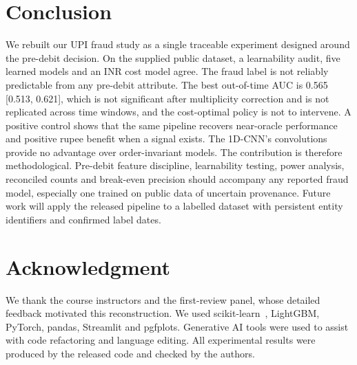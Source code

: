 \documentclass[conference]{IEEEtran}
\begin{document}
\section{Conclusion}
We rebuilt our UPI fraud study as a single traceable experiment designed around the pre-debit decision. On the supplied public dataset, a learnability audit, five learned models and an INR cost model agree. The fraud label is not reliably predictable from any pre-debit attribute. The best out-of-time AUC is 0.565 [0.513, 0.621], which is not significant after multiplicity correction and is not replicated across time windows, and the cost-optimal policy is not to intervene. A positive control shows that the same pipeline recovers near-oracle performance and positive rupee benefit when a signal exists. The 1D-CNN's convolutions provide no advantage over order-invariant models. The contribution is therefore methodological. Pre-debit feature discipline, learnability testing, power analysis, reconciled counts and break-even precision should accompany any reported fraud model, especially one trained on public data of uncertain provenance. Future work will apply the released pipeline to a labelled dataset with persistent entity identifiers and confirmed label dates.

\section*{Acknowledgment}
We thank the course instructors and the first-review panel, whose detailed feedback motivated this reconstruction. We used scikit-learn~\cite{pedregosa2011}, LightGBM, PyTorch, pandas, Streamlit and pgfplots. Generative AI tools were used to assist with code refactoring and language editing. All experimental results were produced by the released code and checked by the authors.
\end{document}
